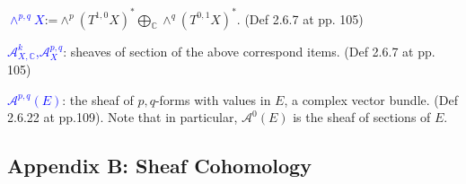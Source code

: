 \documentclass{book}
\numberwithin{equation}{subsection} %
\theoremstyle{definition}
\begin{document}
    \textcolor{blue}{$\wedge^{p,q}X$}:=$\wedge^p(T^{1,0}X)^*
                        \bigoplus_{\mathbb{C}}\wedge^q(T^{0,1}X)^*$. (Def 2.6.7 at pp. 105)

    \textcolor{blue}{$\mathcal{A}^k_{X,\mathbb{C}}$,$\mathcal{A}^{p,q}_X$}: sheaves of section of the above correspond items. (Def 2.6.7 at pp. 105)
    
    \textcolor{blue}{$\mathcal{A}^{p,q}(E)$}: the sheaf of $p,q$-forms with values in $E$, a complex vector bundle. (Def 2.6.22 at pp.109). Note that in particular, $\mathcal{A}^0(E)$ is the sheaf of sections of $E$.

	\subsection{Appendix B: Sheaf Cohomology}
	
\end{document}
